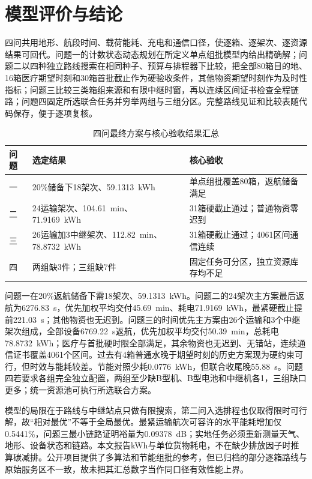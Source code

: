 \section{模型评价与结论}

四问共用地形、航段时间、载荷能耗、充电和通信口径，使逐箱、逐架次、逐资源结果可回代。问题一的计数状态动态规划在所定义单点组批模型内给出精确解；问题二以四种独立路线搜索在相同种子、预算与排程器下比较，把全部80箱目的地、16箱医疗期望时刻和30箱首批截止作为硬验收条件，其他物资期望时刻作为及时性指标；问题三比较三类箱组来源和有限中继时窗，再以连续区间证书检查全程链路；问题四固定所选联合任务并穷举两组与三组分区。完整路线见证和比较表随代码保存，便于逐项复核。

\begin{table}[H]\centering\small
\caption{四问最终方案与核心验收结果汇总}\label{tab:final_summary}
\begin{tabular}{lp{5.9cm}p{5.0cm}}\toprule
问题 & 选定结果 & 核心验收\\\midrule
一 & 20\%储备下18架次、59.1313~kWh & 单点组批覆盖80箱，返航储备满足\\
二 & 24运输架次、104.61~min、71.9169~kWh & 31箱硬截止通过；普通物资零迟到\\
三 & 26运输加3中继架次、112.82~min、78.8732~kWh & 31箱硬截止通过；4061区间通信连续\\
四 & 两组缺3件；三组缺7件 & 固定任务可分区，独立资源库存均不足\\\bottomrule
\end{tabular}\end{table}

问题一在20\%返航储备下需18架次、59.1313~kWh。问题二的24架次主方案最后返航为6276.83~s，优先加权平均交付45.69~min、耗电71.9169~kWh，最紧硬截止提前221.03~s；其他物资也无迟到。问题三的时间优先主方案由26个运输和3个中继架次组成，全部设备6769.22~s返航，优先加权平均交付50.39~min，总耗电78.8732~kWh；医疗与首批硬时限全部满足，其余物资也无迟到、无错站，连续通信证书覆盖4061个区间。过去有4箱普通水晚于期望时刻的历史方案现为硬约束可行，但时效与能耗较差。节能对照少耗0.0776~kWh，但联合收尾晚55.88~s。问题四若要求各组完全独立配置，两组至少缺B型机、B型电池和中继机各1，三组缺口更多；统一资源池可执行所选联合方案。

模型的局限在于路线与中继站点只做有限搜索，第二问入选排程也仅取得限时可行解，故“相对最优”不等于全局最优。最紧运输航次可容许的水平能耗增加仅0.5441\%，问题三最小链路证明裕量为0.09378~dB；实地任务必须重新测量天气、地形、设备状态和链路。本文报告kWh与单位货物耗电，不在缺少排放因子时推算碳减排。公开项目提供了多算法和节能组批的参考，但已归档的部分逐箱路线与原始服务区不一致，故未把其汇总数字当作同口径有效性能上界。
